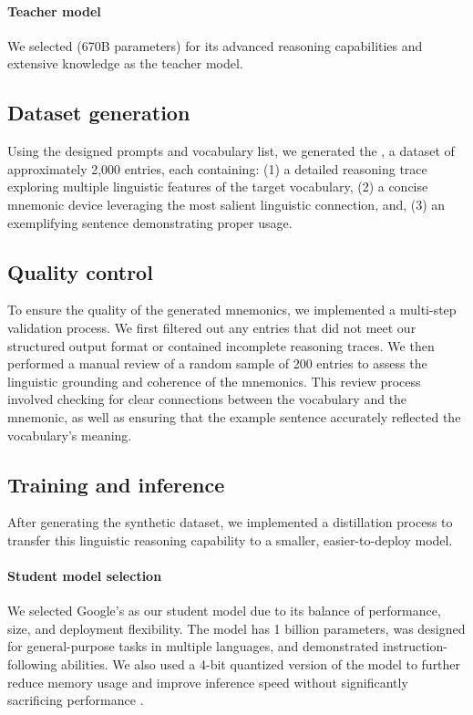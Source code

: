 \paragraph*{Teacher model} We selected \teachermodel (670B parameters) \citep{DeepSeek-AIDEEPSEEKR12025} for its advanced reasoning capabilities and extensive knowledge as the teacher model.

\subsection{Dataset generation} \label{sec:data-gen}

Using the designed prompts and vocabulary list, we generated the \links, a dataset of approximately 2,000 entries, each containing: (1) a detailed reasoning trace exploring multiple linguistic features of the target vocabulary, (2) a concise mnemonic device leveraging the most salient linguistic connection, and, (3) an exemplifying sentence demonstrating proper usage.

\subsection{Quality control} To ensure the quality of the generated mnemonics, we implemented a multi-step validation process. We first filtered out any entries that did not meet our structured output format or contained incomplete reasoning traces. We then performed a manual review of a random sample of 200 entries to assess the linguistic grounding and coherence of the mnemonics. This review process involved checking for clear connections between the vocabulary and the mnemonic, as well as ensuring that the example sentence accurately reflected the vocabulary's meaning.

\subsection{Training and inference} \label{sec:training-inference}
After generating the synthetic dataset, we implemented a distillation process to transfer this linguistic reasoning capability to a smaller, easier-to-deploy model.

\paragraph*{Student model selection} We selected Google's \studentmodel \citep{GemmaTeamGEMMA2025} as our student model due to its balance of performance, size, and deployment flexibility. The model has 1 billion parameters, was designed for general-purpose tasks in multiple languages, and demonstrated instruction-following abilities. We also used a 4-bit quantized version of the model to further reduce memory usage and improve inference speed without significantly sacrificing performance \citep{dettmersQLoRAEfficientFinetuning2023}.


